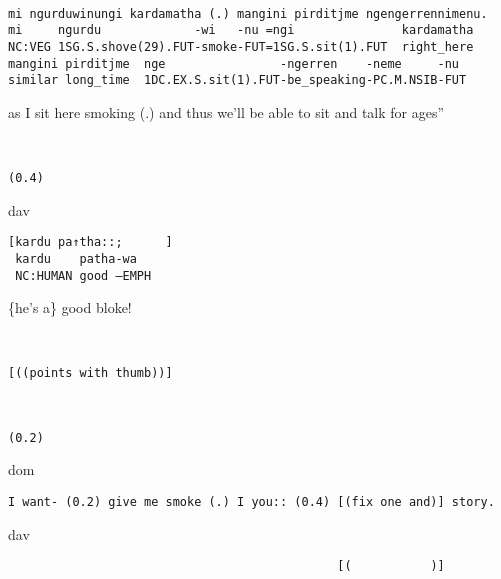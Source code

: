 \documentclass[output=paper,nonflat,colorlinks,citecolor=brown]{langsci/langscibook}
\begin{document}
%
\begin{mdframednoverticalspace}[style=firstfoc]
\begin{transbox}{8}{~}
\begin{verbatim}
mi ngurduwinungi kardamatha (.) mangini pirditjme ngengerrennimenu.
mi     ngurdu             -wi   -nu =ngi               kardamatha
NC:VEG 1SG.S.shove(29).FUT-smoke-FUT=1SG.S.sit(1).FUT  right_here
mangini pirditjme  nge                -ngerren    -neme     -nu
similar long_time  1DC.EX.S.sit(1).FUT-be_speaking-PC.M.NSIB-FUT
\end{verbatim}
as I sit here smoking (.) and thus we'll be able to sit and talk for ages”
\end{transbox}
\end{mdframednoverticalspace}
%
\begin{transbox}{9}{~}
\begin{verbatim}
(0.4)
\end{verbatim}
\end{transbox}
%
\begin{mdframednoverticalspace}[style=firstfoc]
\begin{transbox}{10}{dav}
\begin{verbatim}
[kardu pa↑tha::;      ]
 kardu    patha-wa
 NC:HUMAN good –EMPH
\end{verbatim}
\{he's a\} good bloke!
\end{transbox}
\end{mdframednoverticalspace}
%
\begin{mdframednoverticalspace}[style=firstfoc]
\begin{transbox}{11}{~}
\begin{verbatim}
[((points with thumb))]
\end{verbatim}
\end{transbox}
\end{mdframednoverticalspace}
%
\begin{transbox}{12}{~}
\begin{verbatim}
(0.2)
\end{verbatim}
\end{transbox}
%
\begin{transbox}{13}{dom}
\begin{verbatim}
I want- (0.2) give me smoke (.) I you:: (0.4) [(fix one and)] story.
\end{verbatim}
\end{transbox}
%
\begin{transbox}{14}{dav}
\begin{verbatim}
                                              [(           )]
\end{verbatim}
\end{transbox}
\end{document}
